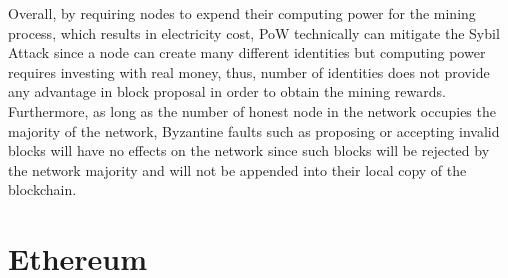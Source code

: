 

Overall, by requiring nodes to expend their computing power for the mining process, which results in electricity cost, PoW technically can mitigate the Sybil Attack since a node can create many different identities but computing power requires investing with real money, thus, number of identities does not provide any advantage in block proposal in order to obtain the mining rewards. Furthermore, as long as the number of honest node in the network occupies the majority of the network, Byzantine faults such as proposing or accepting invalid blocks will have no effects on the network since such blocks will be rejected by the network majority and will not be appended into their local copy of the blockchain.




\section{Ethereum}

